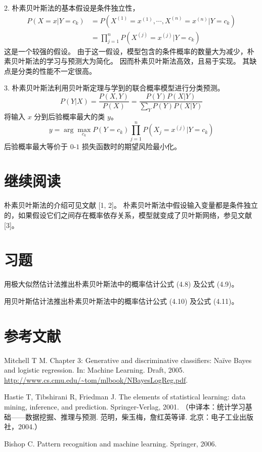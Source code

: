 \documentclass[UTF8, 12pt, fontset=fandol, oneside]{ctexart}
\begin{document}
2. 朴素贝叶斯法的基本假设是条件独立性，
\[
\begin{aligned}
  P(X=x|Y=c_k)
  &=P(X^{(1)}=x^{(1)},\cdots,X^{(n)}=x^{(n)}|Y=c_k)\\
  &=\prod_{j=1}^n P(X^{(j)}=x^{(j)}|Y=c_k)
\end{aligned}
\]
这是一个较强的假设。
由于这一假设，模型包含的条件概率的数量大为减少，朴素贝叶斯法的学习与预测大为简化。
因而朴素贝叶斯法高效，且易于实现。
其缺点是分类的性能不一定很高。

3. 朴素贝叶斯法利用贝叶斯定理与学到的联合概率模型进行分类预测。
\[
  P(Y|X)=\frac{P(X,Y)}{P(X)}
  =
  \frac{P(Y)P(X|Y)}{\sum_Y P(Y)P(X|Y)}
\]
将输入 $x$ 分到后验概率最大的类 $y$。
\[
  y=\arg\max_{c_k}P(Y=c_k)\prod_{j=1}^n P(X_j=x^{(j)}|Y=c_k)
\]
后验概率最大等价于 $0$-$1$ 损失函数时的期望风险最小化。

\section*{继续阅读}

朴素贝叶斯法的介绍可见文献 [1, 2]。
朴素贝叶斯法中假设输入变量都是条件独立的，如果假设它们之间存在概率依存关系，模型就变成了贝叶斯网络，参见文献 [3]。

\section*{习题}

\quad 用极大似然估计法推出朴素贝叶斯法中的概率估计公式 (4.8) 及公式 (4.9)。

\quad 用贝叶斯估计法推出朴素贝叶斯法中的概率估计公式 (4.10) 及公式 (4.11)。

\section*{参考文献}

\noindent [1]\quad Mitchell T M. Chapter 3: Generative and discriminative classifiers: Naïve Bayes and logistic regression. In: Machine Learning. Draft, 2005. \url{http://www.cs.cmu.edu/~tom/mlbook/NBayesLogReg.pdf}.

\noindent [2]\quad Hastie T, Tibshirani R, Friedman J. The elements of statistical learning: data mining, inference, and prediction. Springer-Verlag, 2001. （中译本：统计学习基础——数据挖掘、推理与预测. 范明，柴玉梅，詹红英等译. 北京：电子工业出版社，2004.）

\noindent [3]\quad Bishop C. Pattern recognition and machine learning. Springer, 2006.
\end{document}

